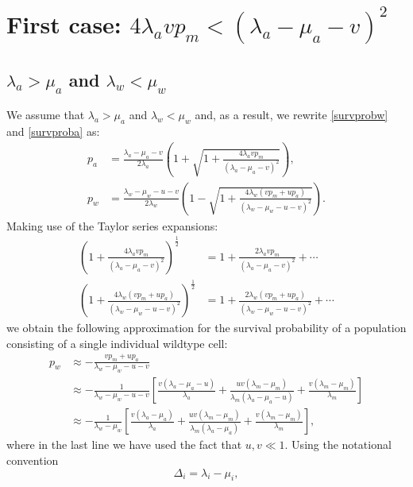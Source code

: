 \documentclass[11pt,a4paper]{article}
\begin{document}
\section{First case: $4\lambda_avp_m<\left(\lambda_a-\mu_a-v\right)^2$}
\subsection{$\lambda_a>\mu_a$ and $\lambda_w<\mu_w$}
We assume that $\lambda_a>\mu_a$ and $\lambda_w<\mu_w$ and, as a result, we rewrite \eqref{survprobw} and \eqref{survproba} as:
\begin{align*}
p_a&=\frac{\lambda_a-\mu_a-v}{2\lambda_a}\left(1+\sqrt{1+\frac{4\lambda_avp_m}{\left(\lambda_a-\mu_a-v\right)^2}}\right),\\
p_w&=\frac{\lambda_w-\mu_w-u-v}{2\lambda_w}\left(1-\sqrt{1+\frac{4\lambda_w\left(vp_m+up_a\right)}{\left(\lambda_w-\mu_w-u-v\right)^2}}\right).
\end{align*}
Making use of the Taylor series expansions:
\begin{align*}
\left(1+\frac{4\lambda_avp_m}{\left(\lambda_a-\mu_a-v\right)^2}\right)^{\frac{1}{2}}&=1+\frac{2\lambda_avp_m}{\left(\lambda_a-\mu_a-v\right)^2}+\cdots\\
\left(1+\frac{4\lambda_w\left(vp_m+up_a\right)}{\left(\lambda_w-\mu_w-u-v\right)^2}\right)^{\frac{1}{2}}&=1+\frac{2\lambda_w\left(vp_m+up_a\right)}{\left(\lambda_w-\mu_w-u-v\right)^2}+\cdots
\end{align*}
we obtain the following approximation for the survival probability of a population consisting of a single individual wildtype cell:
\begin{align}\label{survprobwinitial}
p_w&\approx-\frac{vp_m+up_a}{\lambda_w-\mu_w-u-v}\\
\nonumber
&\approx-\frac{1}{\lambda_w-\mu_w-u-v}\left[\frac{v\left(\lambda_a-\mu_a-u\right)}{\lambda_a}+\frac{uv\left(\lambda_m-\mu_m\right)}{\lambda_m\left(\lambda_a-\mu_a-u\right)}+\frac{v\left(\lambda_m-\mu_m\right)}{\lambda_m}\right]\\ \label{survprobw2}
&\approx-\frac{1}{\lambda_w-\mu_w}\left[\frac{v\left(\lambda_a-\mu_a\right)}{\lambda_a}+\frac{uv\left(\lambda_m-\mu_m\right)}{\lambda_m\left(\lambda_a-\mu_a\right)}+\frac{v\left(\lambda_m-\mu_m\right)}{\lambda_m}\right],
\end{align}
where in the last line we have used the fact that $u,v\ll1$. Using the notational convention
\begin{equation}\label{notationalconv}
\Delta_i=\lambda_i-\mu_i,
\end{equation}
\end{document}
